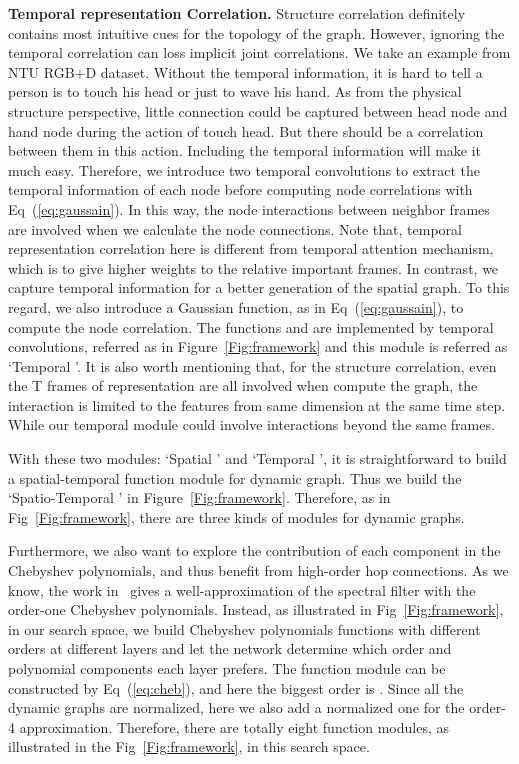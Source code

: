 \documentclass[letterpaper]{article} \usepackage{aaai19}  \usepackage{times}  \usepackage{helvet} \usepackage{courier}  \usepackage[hyphens]{url}  \usepackage{graphicx} \urlstyle{rm} \def\UrlFont{\rm}  \usepackage{graphicx}  \frenchspacing  \setlength{\pdfpagewidth}{8.5in}  \setlength{\pdfpageheight}{11in}
\begin{document}
\noindent\textbf{Temporal representation Correlation.} Structure correlation definitely contains most intuitive cues for the topology of the graph. However, ignoring the temporal correlation can loss implicit joint correlations. We take an example from NTU RGB+D dataset. Without the temporal information, it is hard to tell a person is to touch his head or just to wave his hand. As from the physical structure perspective, little connection could be captured between head node and hand node during the action of touch head. But there should be a correlation between them in this action. Including the temporal information will make it much easy. Therefore, we introduce two temporal convolutions to extract the temporal information of each node before computing node correlations with Eq~(\ref{eq:gaussain}). In this way, the node interactions between neighbor frames are involved when we calculate the node connections. Note that, temporal representation correlation here is different from temporal attention mechanism, which is to give higher weights to the relative important frames. In contrast, we capture temporal information for a better generation of the spatial graph. To this regard, we also introduce a Gaussian function, as in Eq~(\ref{eq:gaussain}), to compute the node correlation. The functions  and  are implemented by temporal convolutions, referred as  in Figure~\ref{Fig:framework} and this module is referred as `Temporal '. It is also worth mentioning that, for the structure correlation, even the T frames of representation are all involved when compute the graph, the interaction is limited to the features from same dimension at the same time step. While our temporal module could involve interactions beyond the same frames.

With these two modules: `Spatial ' and `Temporal ', it is straightforward to build a spatial-temporal function module for dynamic graph. Thus we build the `Spatio-Temporal ' in Figure~\ref{Fig:framework}. Therefore, as in Fig~\ref{Fig:framework}, there are three kinds of modules for dynamic graphs. 

Furthermore, we also want to explore the contribution of each component in the Chebyshev polynomials, and thus benefit from high-order hop connections. As we know, the work in~\cite{kipf2016semi} gives a well-approximation of the spectral filter with the order-one Chebyshev polynomials. Instead, as illustrated in Fig~\ref{Fig:framework}, in our search space, we build Chebyshev polynomials functions with different orders at different layers and let the network determine which order and polynomial components each layer prefers. The function module can be constructed by Eq~(\ref{eq:cheb}), and here the biggest order is . Since all the dynamic graphs are normalized, here we also add a normalized one for the order-4 approximation. Therefore, there are totally eight function modules, as illustrated in the Fig~\ref{Fig:framework}, in this search space. 
\end{document}
